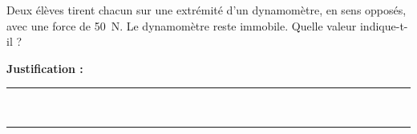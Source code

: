 Deux élèves tirent chacun sur une extrémité d'un dynamomètre, en sens opposés, avec une force de \qty{50}{N}. Le dynamomètre reste immobile. Quelle valeur indique-t-il ?

\choices

\noindent\textbf{Justification :} \hrulefill \\[2.5ex]
\rule{\linewidth}{0.4pt} \\[2.5ex]
\rule{\linewidth}{0.4pt}
\vfill

